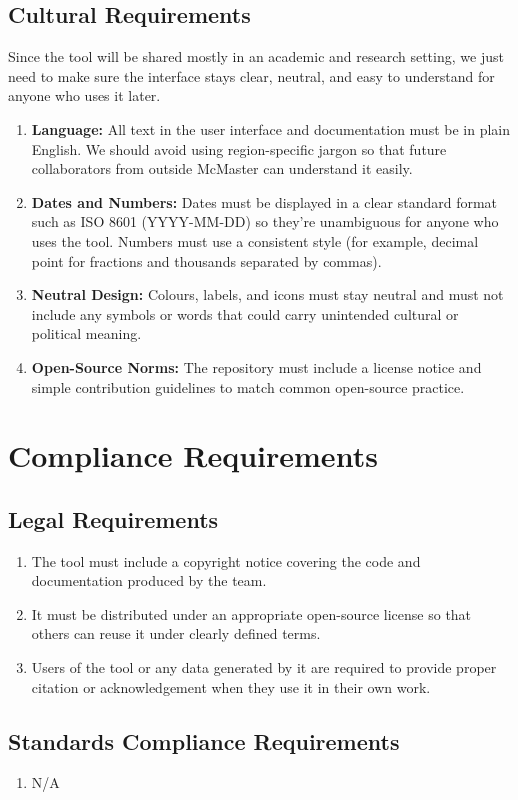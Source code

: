 \documentclass[12pt]{article}
\begin{document}
\subsection{Cultural Requirements}
Since the tool will be shared mostly in an academic and research setting, we just need to make sure the interface stays clear, neutral, and easy to understand for anyone who uses it later.
\begin{enumerate}[label=CU-CR\arabic*]
\item \textbf{Language:} All text in the user interface and documentation must be in plain English. We should avoid using region-specific jargon so that future collaborators from outside McMaster can understand it easily.
\item \textbf{Dates and Numbers:} Dates must be displayed in a clear standard format such as ISO 8601 (YYYY-MM-DD) so they’re unambiguous for anyone who uses the tool. Numbers must use a consistent style (for example, decimal point for fractions and thousands separated by commas).
\item \textbf{Neutral Design:} Colours, labels, and icons must stay neutral and must not include any symbols or words that could carry unintended cultural or political meaning.
\item \textbf{Open-Source Norms:} The repository must include a license notice and simple contribution guidelines to match common open-source practice.
\end{enumerate}
\section{Compliance Requirements}
\subsection{Legal Requirements}
\begin{enumerate}[label=CR-LR\arabic*]
\item The tool must include a copyright notice covering the code and documentation produced by the team.
\item It must be distributed under an appropriate open-source license so that others can reuse it under clearly defined terms.
\item Users of the tool or any data generated by it are required to provide proper citation or acknowledgement when they use it in their own work.
\end{enumerate}
\subsection{Standards Compliance Requirements}
\begin{enumerate}[label=CR-STD\arabic*]
\item N/A
\end{enumerate}
\end{document}
